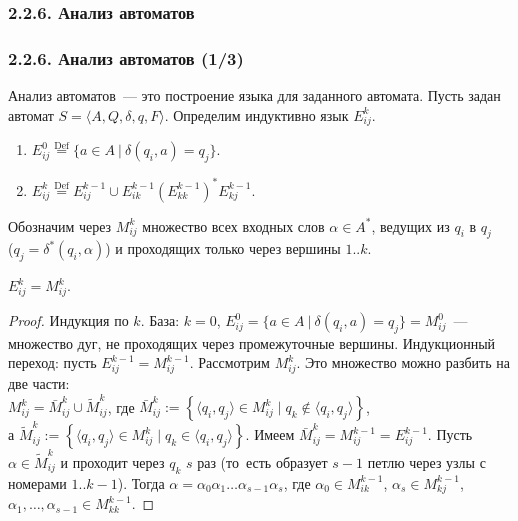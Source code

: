 \documentclass[mathserif,12pt,aspectratio=169]{beamer}
\def\Set#1#2{\left\{ #1 \mid #2 \right\}}
\def\Assign{\operatorname{:=}}
\def\Def{\stackrel{\text{Def}}{=}}
\begin{document}
\subsubsection{2.2.6. Анализ автоматов}
\label{2.2.6.}
\begin{frame}
\frametitle{2.2.6. Анализ автоматов (1/3)}
Анализ автоматов~--- это
построение языка для заданного автомата. Пусть задан автомат
$S=\langle A, Q, \delta, q, F\rangle$. Определим индуктивно язык
$E^k_{ij}$.
\begin{enumerate}
  \item $E^0_{ij}\Def \{a\in A~|~ \delta(q_i, a)= q_j\}$.
  \item $E^k_{ij}\Def E^{k-1}_{ij}\cup E^{k-1}_{ik} (E^{k-1}_{kk})^* E^{k-1}_{kj}$.
\end{enumerate}

Обозначим через $M_{ij}^k$ множество всех входных слов $\alpha\in A^*$,
ведущих из
$q_i$ в $q_j$ \\($q_j=\delta^{*}(q_i,\alpha)$)
и проходящих только через вершины $1..k$.

\begin{lemma}
$E^k_{ij}= M^k_{ij}$.
\end{lemma}
\begin{proof}
Индукция по $k$. База: $k=0$, $E^0_{ij}=\{a\in A~|~ \delta(q_i, a)=
q_j\}= M^0_{ij}$~--- множество дуг, не проходящих через
промежуточные вершины. Индукционный переход: пусть $E^{k-1}_{ij}= M^{k-1}_{ij}$.
Рассмотрим $M^k_{ij}$. Это множество можно разбить на две части:\\
 $M_{ij}^k = \bar{M}_{ij}^k
\cup\tilde{M}_{ij}^k$, где $\bar{M}_{ij}^k\Assign \Set{\langle q_i,
q_j\rangle\in M_{ij}^k}{q_k \not\in \langle q_i, q_j\rangle}$,\\
а $\tilde{M}_{ij}^k\Assign \Set{\langle q_i, q_j\rangle \in M_{ij}^k}
{q_k\in \langle q_i, q_j\rangle}$. Имеем $\bar{M}_{ij}^k =
M_{ij}^{k-1} = E_{ij}^{k-1}$. Пусть $\alpha\in \tilde{M}_{ij}^k$ и
проходит через $q_k$ $s$ раз (то~есть образует $s-1$ петлю через
узлы с номерами $1..k-1$). Тогда $\alpha= \alpha_0
\alpha_1\dots \alpha_{s-1}\alpha_s$, где $\alpha_0 \in
M^{k-1}_{ik}$, $\alpha_s \in M_{kj}^{k-1}$, $\alpha_1, \dots,
\alpha_{s-1}\in M^{k-1}_{kk}$.  
\end{proof}
\end{frame}
\end{document}
